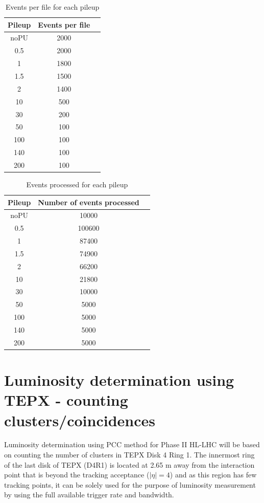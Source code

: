 \begin{table}[htbp]
  \centering
  \caption{Events per file for each pileup}
  \label{tab:sample}
  \begin{tabular}{ccc}
     \textbf{Pileup} & \textbf{Events per file} \\
     \hline
     noPU &   2000\\
     0.5 &   2000\\
     1&    1800\\
      1.5&  1500\\
      2&   1400\\
     10&    500\\
     30&    200\\
      50&   100\\
      100&   100\\
     140&    100\\
       200&    100\\
  \end{tabular}
\end{table}



\begin{table}[htbp]
  \centering
  \caption{Events processed for each pileup}
  \label{tab:sample}
  \begin{tabular}{ccc}
     \textbf{Pileup} & \textbf{Number of events processed} \\
     \hline
     noPU & 10000  \\
     0.5 &  100600 \\
     1&    87400\\
      1.5& 74900 \\
      2&  66200 \\
     10&   21800 \\
     30&    10000\\
      50&   5000\\
      100&   5000\\
     140&    5000\\
       200&    5000\\
  \end{tabular}
\end{table}


\section{Luminosity determination using TEPX - counting clusters/coincidences}

Luminosity determination using PCC method for Phase II HL-LHC will be based on counting the number of clusters in TEPX Disk 4 Ring 1. The innermost ring of the last disk of TEPX (D4R1) is located at 2.65 m away from the interaction point that is beyond the tracking acceptance ($|\eta| = 4$) and as this region has few tracking points, it can be solely used for the purpose of luminosity measurement by using the full available trigger rate and bandwidth.

